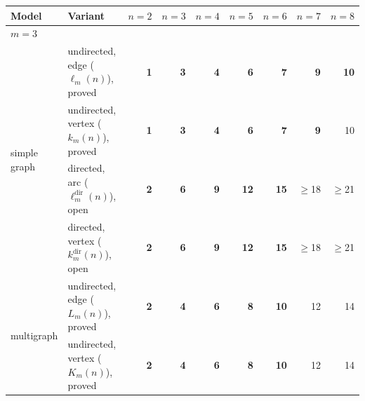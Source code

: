 \begin{tabular}{llrrrrrrr}
\toprule
Model & Variant & $n=2$ & $n=3$ & $n=4$ & $n=5$ & $n=6$ & $n=7$ & $n=8$ \\
\midrule
\multicolumn{9}{l}{\textbf{$m=3$}} \\
\midrule
\multirow{4}{*}{simple graph} & undirected, edge ($\ell_m(n)$), \textcolor{vtProved}{proved} & \textcolor{vtExact}{\textbf{1}} & \textcolor{vtExact}{\textbf{3}} & \textcolor{vtExact}{\textbf{4}} & \textcolor{vtExact}{\textbf{6}} & \textcolor{vtExact}{\textbf{7}} & \textcolor{vtExact}{\textbf{9}} & \textcolor{vtExact}{\textbf{10}} \\
 & undirected, vertex ($k_m(n)$), \textcolor{vtProved}{proved} & \textcolor{vtExact}{\textbf{1}} & \textcolor{vtExact}{\textbf{3}} & \textcolor{vtExact}{\textbf{4}} & \textcolor{vtExact}{\textbf{6}} & \textcolor{vtExact}{\textbf{7}} & \textcolor{vtExact}{\textbf{9}} & \textcolor{vtProved}{10} \\
 & directed, arc ($\ell_m^{\mathrm{dir}}(n)$), \textcolor{vtOpen}{open} & \textcolor{vtExact}{\textbf{2}} & \textcolor{vtExact}{\textbf{6}} & \textcolor{vtExact}{\textbf{9}} & \textcolor{vtExact}{\textbf{12}} & \textcolor{vtExact}{\textbf{15}} & \textcolor{vtOpen}{$\ge$18} & \textcolor{vtOpen}{$\ge$21} \\
 & directed, vertex ($k_m^{\mathrm{dir}}(n)$), \textcolor{vtOpen}{open} & \textcolor{vtExact}{\textbf{2}} & \textcolor{vtExact}{\textbf{6}} & \textcolor{vtExact}{\textbf{9}} & \textcolor{vtExact}{\textbf{12}} & \textcolor{vtExact}{\textbf{15}} & \textcolor{vtOpen}{$\ge$18} & \textcolor{vtOpen}{$\ge$21} \\
\midrule
\multirow{4}{*}{multigraph} & undirected, edge ($L_m(n)$), \textcolor{vtProved}{proved} & \textcolor{vtExact}{\textbf{2}} & \textcolor{vtExact}{\textbf{4}} & \textcolor{vtExact}{\textbf{6}} & \textcolor{vtExact}{\textbf{8}} & \textcolor{vtExact}{\textbf{10}} & \textcolor{vtProved}{12} & \textcolor{vtProved}{14} \\
 & undirected, vertex ($K_m(n)$), \textcolor{vtProved}{proved} & \textcolor{vtExact}{\textbf{2}} & \textcolor{vtExact}{\textbf{4}} & \textcolor{vtExact}{\textbf{6}} & \textcolor{vtExact}{\textbf{8}} & \textcolor{vtExact}{\textbf{10}} & \textcolor{vtProved}{12} & \textcolor{vtProved}{14} \\

\end{tabular}

